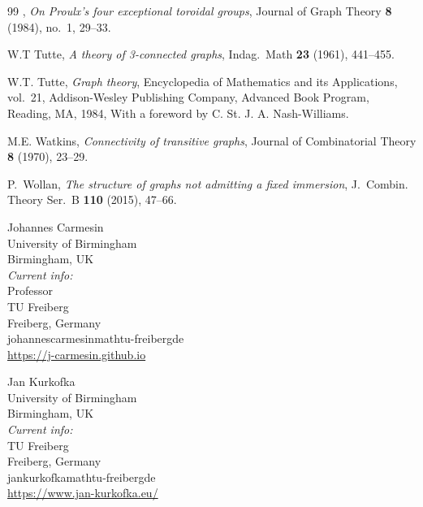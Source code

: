\documentclass{aic}
\theoremstyle{plain}
\theoremstyle{definition}
\theoremstyle{plain}
\theoremstyle{plain}
\begin{document}
\begin{thebibliography}{99}
\bysame, \emph{On {P}roulx's four exceptional toroidal groups}, Journal of
  Graph Theory \textbf{8} (1984), no.~1, 29--33.

W.T Tutte, \emph{A theory of 3-connected graphs}, Indag.\ Math \textbf{23}
  (1961), 441--455.

W.T. Tutte, \emph{Graph theory}, Encyclopedia of Mathematics and its
  Applications, vol.~21, Addison-Wesley Publishing Company, Advanced Book
  Program, Reading, MA, 1984, With a foreword by C. St. J. A. Nash-Williams.

M.E. Watkins, \emph{Connectivity of transitive graphs}, Journal of
  Combinatorial Theory \textbf{8} (1970), 23--29.

P.~Wollan, \emph{The structure of graphs not admitting a fixed immersion},
  J.~Combin. Theory Ser.~B \textbf{110} (2015), 47--66.
\end{thebibliography}

\begin{aicauthors}
\begin{authorinfo}[jc]
  Johannes Carmesin\\
  University of Birmingham\\
  Birmingham, UK\\
  \emph{Current info:}\\
  Professor\\
  TU Freiberg\\
  Freiberg, Germany\\
  johannes\imagedot{}carmesin\imageat{}math\imagedot{}tu-freiberg\imagedot{}de \\
  \url{https://j-carmesin.github.io}
\end{authorinfo}
\begin{authorinfo}[jk]
  Jan Kurkofka\\
  University of Birmingham\\
  Birmingham, UK\\
  \emph{Current info:}\\
  TU Freiberg\\
  Freiberg, Germany\\
  jan\imagedot{}kurkofka\imageat{}math\imagedot{}tu-freiberg\imagedot{}de \\
  \url{https://www.jan-kurkofka.eu/}
\end{authorinfo}
\end{aicauthors}
\end{document}
